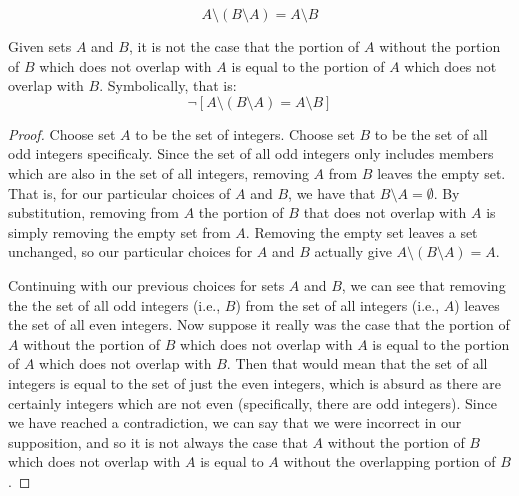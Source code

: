 \documentclass[main.tex]{subfiles}
\begin{document}
\subproblem{}\label{2f}
\[A \setminus (B \setminus A) = A \setminus B\]
\begin{thm}
	Given sets \(A\) and \(B\), it is not the case that the portion of \(A\)
	without the portion of \(B\) which does not overlap with \(A\) is equal
	to the portion of \(A\) which does not overlap with \(B\). Symbolically,
	that is:
	\[\neg [A \setminus (B \setminus A) = A \setminus B]\]
\end{thm}
\begin{proof}
	Choose set \(A\) to be the set of integers. Choose set \(B\) to be the
	set of all odd integers specificaly. Since the set of all odd integers
	only includes members which are also in the set of all integers,
	removing \(A\) from \(B\) leaves the empty set. That is, for our
	particular choices of \(A\) and \(B\), we have that
	\(B \setminus A = \emptyset\). By substitution, removing from \(A\) the
	portion of \(B\) that does not overlap with \(A\) is simply removing the
	empty set from \(A\). Removing the empty set leaves a set unchanged, so
	our particular choices for \(A\) and \(B\) actually give
	\(A \setminus (B \setminus A) = A\).

	Continuing with our previous choices for sets \(A\) and \(B\), we can
	see that removing the the set of all odd integers (i.e., \(B\)) from
	the set of all integers (i.e., \(A\)) leaves the set of all even
	integers. Now suppose it really was the case that the portion of \(A\)
	without the portion of \(B\) which does not overlap with \(A\) is equal
	to the portion of \(A\) which does not overlap with \(B\). Then that
	would mean that the set of all integers is equal to the set of just the
	even integers, which is absurd as there are certainly integers which are
	not even (specifically, there are odd integers). Since we have reached a
	contradiction, we can say that we were incorrect in our supposition, and
	so it is not always the case that \(A\) without the portion of \(B\)
	which does not overlap with \(A\) is equal to \(A\) without the
	overlapping portion of \(B\).
\end{proof}
\end{document}
